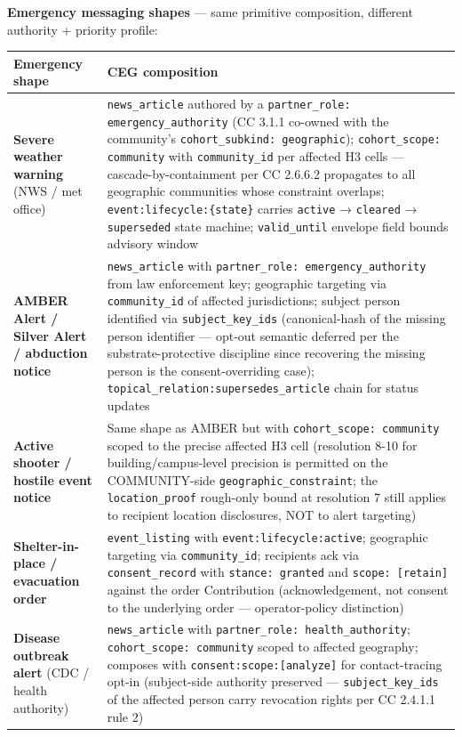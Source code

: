 \documentclass[11pt]{article}
\begin{document}
\textbf{Emergency messaging shapes} — same primitive composition, different authority + priority profile:


{\footnotesize
\begin{longtable}{|p{8.0cm}|p{8.0cm}|}\hline
\textbf{Emergency shape} & \textbf{CEG composition} \\ \hline\endhead
\textbf{Severe weather warning} (NWS / met office) & \texttt{news\_article} authored by a \texttt{partner\_role: emergency\_authority} (CC 3.1.1 co-owned with the community's \texttt{cohort\_subkind: geographic}); \texttt{cohort\_scope: community} with \texttt{community\_id} per affected H3 cells — cascade-by-containment per CC 2.6.6.2 propagates to all geographic communities whose constraint overlaps; \texttt{event:lifecycle:\{state\}} carries \texttt{active} → \texttt{cleared} → \texttt{superseded} state machine; \texttt{valid\_until} envelope field bounds advisory window \\ \hline
\textbf{AMBER Alert / Silver Alert / abduction notice} & \texttt{news\_article} with \texttt{partner\_role: emergency\_authority} from law enforcement key; geographic targeting via \texttt{community\_id} of affected jurisdictions; subject person identified via \texttt{subject\_key\_ids} (canonical-hash of the missing person identifier — opt-out semantic deferred per the substrate-protective discipline since recovering the missing person is the consent-overriding case); \texttt{topical\_relation:supersedes\_article} chain for status updates \\ \hline
\textbf{Active shooter / hostile event notice} & Same shape as AMBER but with \texttt{cohort\_scope: community} scoped to the precise affected H3 cell (resolution 8-10 for building/campus-level precision is permitted on the COMMUNITY-side \texttt{geographic\_constraint}; the \texttt{location\_proof} rough-only bound at resolution 7 still applies to recipient location disclosures, NOT to alert targeting) \\ \hline
\textbf{Shelter-in-place / evacuation order} & \texttt{event\_listing} with \texttt{event:lifecycle:active}; geographic targeting via \texttt{community\_id}; recipients ack via \texttt{consent\_record} with \texttt{stance: granted} and \texttt{scope: [retain]} against the order Contribution (acknowledgement, not consent to the underlying order — operator-policy distinction) \\ \hline
\textbf{Disease outbreak alert} (CDC / health authority) & \texttt{news\_article} with \texttt{partner\_role: health\_authority}; \texttt{cohort\_scope: community} scoped to affected geography; composes with \texttt{consent:scope:[analyze]} for contact-tracing opt-in (subject-side authority preserved — \texttt{subject\_key\_ids} of the affected person carry revocation rights per CC 2.4.1.1 rule 2) \\ \hline

\end{longtable}}
\end{document}
